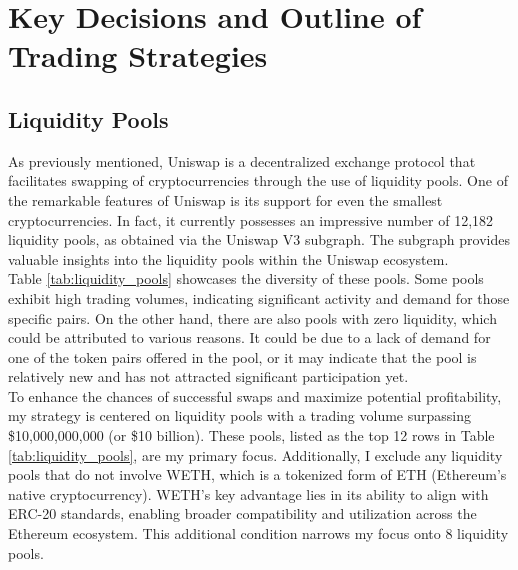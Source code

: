 \chapter{Key Decisions and Outline of Trading Strategies}

\section{Liquidity Pools} \label{sec:liquidity-pools}
As previously mentioned, Uniswap is a decentralized exchange protocol that facilitates swapping of cryptocurrencies through the use of liquidity pools. One of the remarkable features of Uniswap is its support for even the smallest cryptocurrencies. In fact, it currently possesses an impressive number of 12,182 liquidity pools, as obtained via the Uniswap V3 subgraph. The subgraph provides valuable insights into the liquidity pools within the Uniswap ecosystem.
\\[5mm]
Table \ref{tab:liquidity_pools} showcases the diversity of these pools. Some pools exhibit high trading volumes, indicating significant activity and demand for those specific pairs. On the other hand, there are also pools with zero liquidity, which could be attributed to various reasons. It could be due to a lack of demand for one of the token pairs offered in the pool, or it may indicate that the pool is relatively new and has not attracted significant participation yet.
\\[5mm]
To enhance the chances of successful swaps and maximize potential profitability, my strategy is centered on liquidity pools with a trading volume surpassing \$10,000,000,000 (or \$10 billion). These pools, listed as the top 12 rows in Table \ref{tab:liquidity_pools}, are my primary focus. Additionally, I exclude any liquidity pools that do not involve WETH, which is a tokenized form of ETH (Ethereum's native cryptocurrency). WETH's key advantage lies in its ability to align with ERC-20 standards, enabling broader compatibility and utilization across the Ethereum ecosystem. This additional condition narrows my focus onto 8 liquidity pools.


